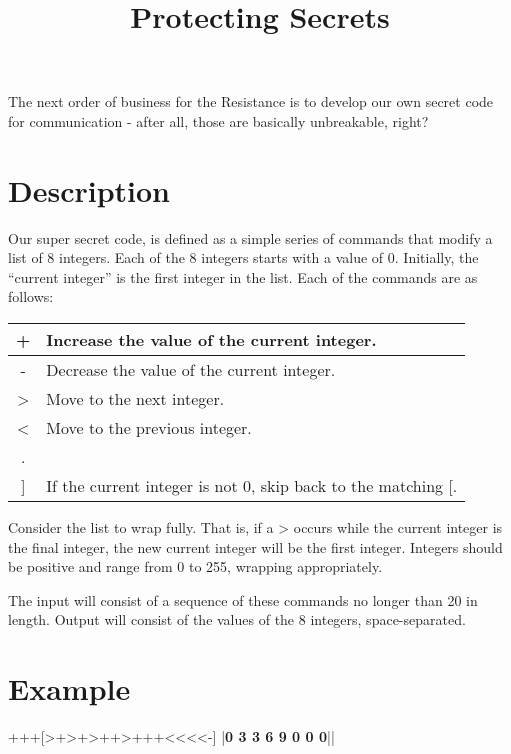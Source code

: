\documentclass{../codeproblem}
\begin{document}
\title{Protecting Secrets}

\begin{flavor}
  The next order of business for the Resistance is to develop our own secret code for communication - after all, those are basically unbreakable, right?
\end{flavor}

\section*{Description}
Our super secret code, is defined as a simple series of commands that modify a list of 8 integers. Each of the 8 integers starts with a value of 0. Initially, the ``current integer'' is the first integer in the list.  Each of the commands are as follows:

\begin{center}
\begin{tabular}{| c | l |}\hline
  + & Increase the value of the current integer.\\\hline
  - & Decrease the value of the current integer.\\\hline
  > & Move to the next integer.\\\hline
  < & Move to the previous integer.\\\hline
  [ & If the current integer is 0, skip to after the matching ].\\\hline
  ] & If the current integer is not 0, skip back to the matching [.\\\hline
\end{tabular}
\end{center}

Consider the list to wrap fully. That is, if a > occurs while the current integer is the final integer, the new current integer will be the first integer. Integers should be positive and range from 0 to 255, wrapping appropriately.

The input will consist of a sequence of these commands no longer than 20 in length. Output will consist of the values of the 8 integers, space-separated.

\section*{Example}
\begin{example}
+++[>+>+>++>+++<<<<-]
|\textbf{0 3 3 6 9 0 0 0}||\end{example}
\end{document}
